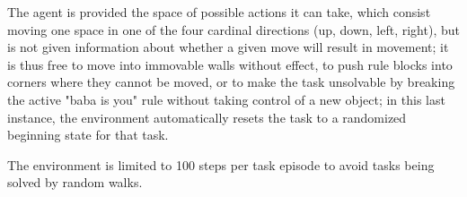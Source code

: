 The agent is provided the space of possible actions it can take, which consist moving
one space in one of the four cardinal directions (up, down, left, right), but is
not given information about whether a given move will result in movement; it is
thus free to move into immovable walls without effect, to push rule blocks into corners
where they cannot be moved, or to make the task unsolvable by breaking the
active "baba is you" rule without taking control of a new object; in this last instance,
the environment automatically resets the task to a randomized beginning state
for that task.

The environment is limited to 100 steps per task episode to avoid tasks being
solved by random walks.